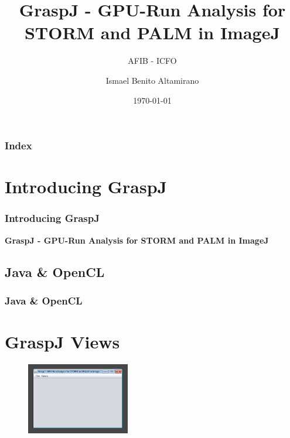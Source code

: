 \documentclass[aspectratio=169]{beamer}
\title[GraspJ]{GraspJ - GPU-Run Analysis for STORM and PALM in ImageJ}
\subtitle{AFIB - ICFO}
\author[Ismael Benito]{\bigskip \small Ismael Benito Altamirano}
\date[AFIB - ICFO]{\small \today}
\begin{document}


\frame{\titlepage}

\begin{frame}
  \frametitle{Index}
  \tableofcontents
\end{frame}

\section{Introducing GraspJ}

\begin{frame}
\frametitle{Introducing GraspJ}

\textbf{GraspJ - GPU-Run Analysis for STORM and PALM in ImageJ}


\end{frame}

\subsection{Java \& OpenCL}

\begin{frame}
 
\frametitle{Java \& OpenCL}
 
\end{frame}





\section{GraspJ Views}

\begin{frame}

\begin{figure}[h!]
    \centering	\includegraphics[width=0.4\textwidth]{./images/graspj.png} 
    \caption{}
    \label{fig:graspj}
    \end{figure} 
 
\end{frame}
\end{document}
